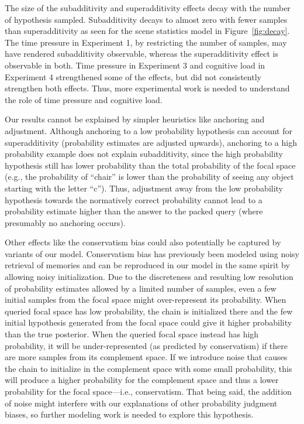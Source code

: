The size of the subadditivity and superadditivity effects decay with the number of hypothesis sampled. Subadditivity decays to almost zero with fewer samples than superadditivity as seen for the scene statistics model in Figure~\ref{fig:decay}. The time pressure in Experiment 1, by restricting the number of samples, may have rendered subadditivity observable, whereas the superadditivity effect is observable in both. Time pressure in Experiment 3 and cognitive load in Experiment 4 strengthened some of the effects, but did not consistently strengthen both effects. Thus, more experimental work is needed to understand the role of time pressure and cognitive load.

Our results cannot be explained by simpler heuristics like anchoring and adjustment. Although anchoring to a low probability hypothesis can account for superadditivity (probability estimates are adjusted upwards), anchoring to a high probability example does not explain subadditivity, since the high probability hypothesis still has lower probability than the total probability of the focal space (e.g., the probability of ``chair'' is lower than the probability of seeing any object starting with the letter ``c''). Thus, adjustment away from the low probability hypothesis towards the normatively correct probability cannot lead to a probability estimate higher than the answer to the packed query (where presumably no anchoring occurs).

Other effects like the conservatism bias could also potentially be captured by variants of our model. Conservatism bias has previously been modeled using noisy retrieval of memories \citep{Dougherty1999,marchiori15} and can be reproduced in our model in the same spirit by allowing noisy initialization. Due to the discreteness and resulting low resolution of probability estimates allowed by a limited number of samples, even a few initial samples from the focal space might over-represent its probability. When queried focal space has low probability, the chain is initialized there and the few initial hypothesis generated from the focal space could give it higher probability than the true posterior. When the queried focal space instead has high probability, it will be under-represented (as predicted by conservatism) if there are more samples from its complement space. If we introduce noise that causes the chain to initialize in the complement space with some small probability, this will produce a higher probability for the complement space and thus a lower  probability for the focal space---i.e., conservatism. That being said, the addition of noise might interfere with our explanations of other probability judgment biases, so further modeling work is needed to explore this hypothesis.

